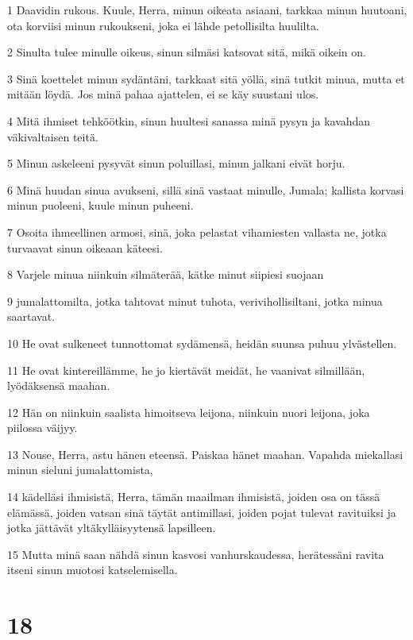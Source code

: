 \par 1 Daavidin rukous. Kuule, Herra, minun oikeata asiaani, tarkkaa minun huutoani, ota korviisi minun rukoukseni, joka ei lähde petollisilta huulilta.
\par 2 Sinulta tulee minulle oikeus, sinun silmäsi katsovat sitä, mikä oikein on.
\par 3 Sinä koettelet minun sydäntäni, tarkkaat sitä yöllä, sinä tutkit minua, mutta et mitään löydä. Jos minä pahaa ajattelen, ei se käy suustani ulos.
\par 4 Mitä ihmiset tehköötkin, sinun huultesi sanassa minä pysyn ja kavahdan väkivaltaisen teitä.
\par 5 Minun askeleeni pysyvät sinun poluillasi, minun jalkani eivät horju.
\par 6 Minä huudan sinua avukseni, sillä sinä vastaat minulle, Jumala; kallista korvasi minun puoleeni, kuule minun puheeni.
\par 7 Osoita ihmeellinen armosi, sinä, joka pelastat vihamiesten vallasta ne, jotka turvaavat sinun oikeaan käteesi.
\par 8 Varjele minua niinkuin silmäterää, kätke minut siipiesi suojaan
\par 9 jumalattomilta, jotka tahtovat minut tuhota, verivihollisiltani, jotka minua saartavat.
\par 10 He ovat sulkeneet tunnottomat sydämensä, heidän suunsa puhuu ylvästellen.
\par 11 He ovat kintereillämme, he jo kiertävät meidät, he vaanivat silmillään, lyödäksensä maahan.
\par 12 Hän on niinkuin saalista himoitseva leijona, niinkuin nuori leijona, joka piilossa väijyy.
\par 13 Nouse, Herra, astu hänen eteensä. Paiskaa hänet maahan. Vapahda miekallasi minun sieluni jumalattomista,
\par 14 kädelläsi ihmisistä, Herra, tämän maailman ihmisistä, joiden osa on tässä elämässä, joiden vatsan sinä täytät antimillasi, joiden pojat tulevat ravituiksi ja jotka jättävät yltäkylläisyytensä lapsilleen.
\par 15 Mutta minä saan nähdä sinun kasvosi vanhurskaudessa, herätessäni ravita itseni sinun muotosi katselemisella.

\chapter{18}

